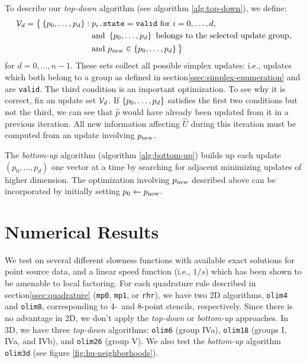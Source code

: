 \documentclass[smallcondensed]{svjour3}
\begin{document}
To describe our \emph{top-down} algorithm (see algorithm \ref{alg:top-down}),
we define:
\begin{equation}\label{eq:calU}
  \begin{aligned}
    \mathcal{V}_d = \big\{\left\{p_0, \hdots, p_d\right\}: \; &p_i\texttt{.state}=\texttt{valid} \mbox{ for } i = 0, \hdots, d, \\
    &\mbox{and } \left\{p_0, \hdots, p_d\right\} \mbox{ belongs to the selected update group}, \\
    &\mbox{and } p_{\operatorname{new}} \in \left\{p_0, \hdots, p_d\right\} \big\}
  \end{aligned}
\end{equation}
for $d = 0, \hdots, n - 1$. These sets collect all possible simplex
updates: i.e., updates which both belong to a group as defined in
section\@ \ref{ssec:simplex-enumeration} and are \texttt{valid}. The
third condition is an important optimization. To see why it is
correct, fix an update set $\mathcal{V}_d$. If $\left\{p_0, \hdots, p_d\right\}$
satisfies the first two conditions but not the third, we can see that
$\hat{p}$ would have already been updated from it in a previous
iteration. All new information affecting $\hat{U}$ during this
iteration must be computed from an update involving $p_{\operatorname{new}}$.

The \emph{bottom-up} algorithm (algorithm \ref{alg:bottom-up}) builds up each
update $(p_0, \hdots, p_d)$ one vector at a time by searching for
adjacent minimizing updates of higher dimension. The optimization
involving $p_{\operatorname{new}}$ described above can be incorporated by initially
setting $p_0 \gets p_{\operatorname{new}}$.

\section{Numerical Results}\label{sec:numerical-results} We test on several different
slowness functions with available exact solutions for point source
data, and a linear speed function (i.e., $1/s$) which has been shown
to be amenable to local factoring. For each quadrature rule described
in section\@ \ref{ssec:quadrature} (\texttt{mp0}, \texttt{mp1}, or
\texttt{rhr}), we have two 2D algorithms, \texttt{olim4} and
\texttt{olim8}, corresponding to 4-\ and 8-point stencils,
respectively. Since there is no advantage in 2D, we don't apply the
\emph{top-down} or \emph{bottom-up} approaches. In 3D, we have three \emph{top-down}
algorithms: \texttt{olim6} (group IVa), \texttt{olim18} (groups I,
IVa, and IVb), and \texttt{olim26} (group V). We also test the
\emph{bottom-up} algorithm \texttt{olim3d} (see figure
\ref{fig:hu-neighborhoods}).
\end{document}
